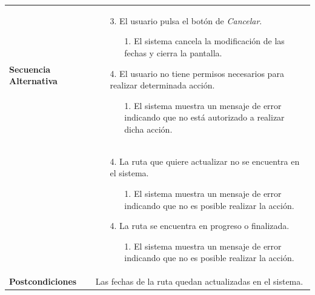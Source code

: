 \begin{longtable}{| p{4cm} | p{10cm} |}
\hline
\textbf{Secuencia Alternativa} &\mbox{}\par\vspace{-\baselineskip}
\begin{enumerate}[leftmargin=0.7cm, topsep=0.1cm]
\item[3.] El usuario pulsa el botón de \textit{Cancelar}.
	\begin{itemize}
	\item[1.] El sistema cancela la modificación de las fechas y cierra la pantalla.
	\end{itemize}
\item[4.] El usuario no tiene permisos necesarios para realizar determinada acción.
	\begin{itemize}
	\item[1.] El sistema muestra un mensaje de error indicando que no está autorizado a realizar dicha acción.
	\end{itemize}
\end{enumerate}
\\ &\mbox{}\par\vspace{-\baselineskip}	
\begin{enumerate}[leftmargin=0.7cm, topsep=0.1cm]
\item[4.] La ruta que quiere actualizar no se encuentra en el sistema.
	\begin{itemize}
	\item[1.] El sistema muestra un mensaje de error indicando que no es posible realizar la acción.
	\end{itemize}
\item[4.] La ruta se encuentra en progreso o finalizada.
	\begin{itemize}
	\item[1.] El sistema muestra un mensaje de error indicando que no es posible realizar la acción.
	\end{itemize}
\end{enumerate}
\\

\hline
\textbf{Postcondiciones} & 
Las fechas de la ruta quedan actualizadas en el sistema.\\
\hline
\end{longtable}



\newpage
